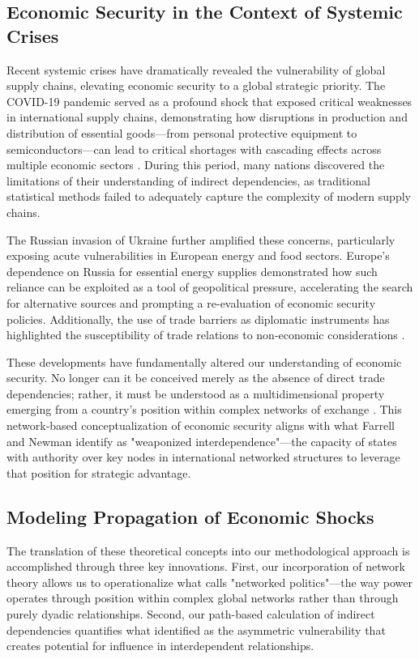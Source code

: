 \documentclass[final,1p,times,authoryear]{elsarticle}
\begin{document}
\subsection{Economic Security in the Context of Systemic Crises}

Recent systemic crises have dramatically revealed the vulnerability of global supply chains, elevating economic security to a global strategic priority. The COVID-19 pandemic served as a profound shock that exposed critical weaknesses in international supply chains, demonstrating how disruptions in production and distribution of essential goods—from personal protective equipment to semiconductors—can lead to critical shortages with cascading effects across multiple economic sectors \cite{swissre2025quantifying}. During this period, many nations discovered the limitations of their understanding of indirect dependencies, as traditional statistical methods failed to adequately capture the complexity of modern supply chains.

The Russian invasion of Ukraine further amplified these concerns, particularly exposing acute vulnerabilities in European energy and food sectors. Europe's dependence on Russia for essential energy supplies demonstrated how such reliance can be exploited as a tool of geopolitical pressure, accelerating the search for alternative sources and prompting a re-evaluation of economic security policies. Additionally, the use of trade barriers as diplomatic instruments has highlighted the susceptibility of trade relations to non-economic considerations \cite{bcg2024chokepoints}.

These developments have fundamentally altered our understanding of economic security. No longer can it be conceived merely as the absence of direct trade dependencies; rather, it must be understood as a multidimensional property emerging from a country's position within complex networks of exchange \cite{strange1988states}. This network-based conceptualization of economic security aligns with what Farrell and Newman \cite{farrell2019weaponized} identify as "weaponized interdependence"—the capacity of states with authority over key nodes in international networked structures to leverage that position for strategic advantage.

\subsection{Modeling Propagation of Economic Shocks}

The translation of these theoretical concepts into our methodological approach is accomplished through three key innovations. First, our incorporation of network theory allows us to operationalize what \citet{kahler2009networked} calls "networked politics"—the way power operates through position within complex global networks rather than through purely dyadic relationships. Second, our path-based calculation of indirect dependencies quantifies what \citet{hirschman1945national} identified as the asymmetric vulnerability that creates potential for influence in interdependent relationships.
\end{document}
